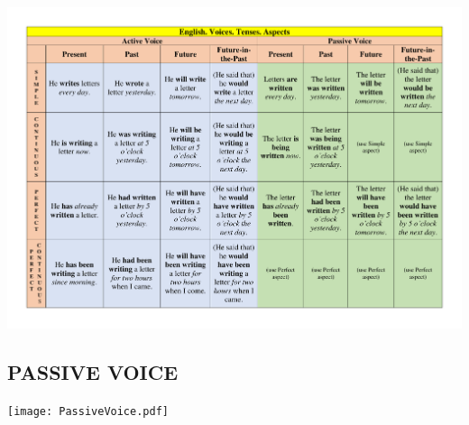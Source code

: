 \documentclass[main.tex]{subfiles}
\begin{document}
{\parindent0pt\includegraphics[width=\textwidth,page=1,trim={0.5in 0in 0.49in 0in},clip=true]{EnglishTensesAspectsVoicesPoster.pdf}}

\subsection{PASSIVE VOICE}

{\parindent-10pt\texttt{[image: PassiveVoice.pdf]}}\newpage
\end{document}

